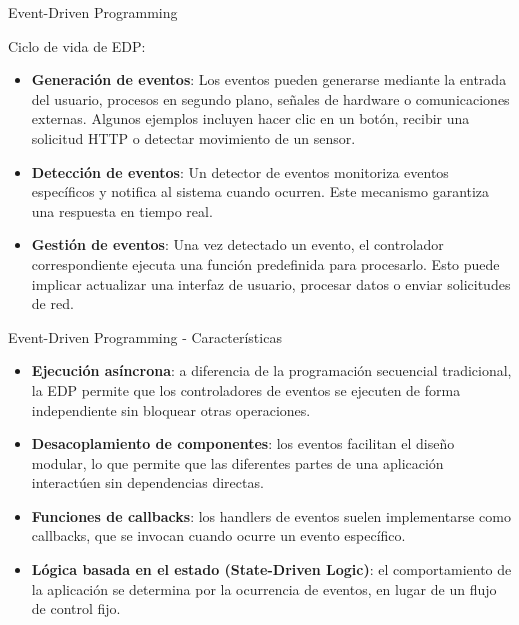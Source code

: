 \documentclass[11pt]{beamer}
\begin{document}
	\begin{frame}{Event-Driven Programming}

		Ciclo de vida de EDP:
		\begin{itemize}
			\item \textbf{Generación de eventos}: Los eventos pueden generarse mediante la entrada del usuario, procesos en segundo plano, señales de hardware o comunicaciones externas. Algunos ejemplos incluyen hacer clic en un botón, recibir una solicitud HTTP o detectar movimiento de un sensor.
			\item \textbf{Detección de eventos}: Un detector de eventos monitoriza eventos específicos y notifica al sistema cuando ocurren. Este mecanismo garantiza una respuesta en tiempo real.
			\item \textbf{Gestión de eventos}: Una vez detectado un evento, el controlador correspondiente ejecuta una función predefinida para procesarlo. Esto puede implicar actualizar una interfaz de usuario, procesar datos o enviar solicitudes de red.
			
		\end{itemize}	
			
	\end{frame}
	
	\begin{frame}{Event-Driven Programming - Características}
	\begin{itemize}
		\item \textbf{Ejecución asíncrona}: a diferencia de la programación secuencial tradicional, la EDP permite que los controladores de eventos se ejecuten de forma independiente sin bloquear otras operaciones.
		\item \textbf{Desacoplamiento de componentes}: los eventos facilitan el diseño modular, lo que permite que las diferentes partes de una aplicación interactúen sin dependencias directas.
		\item \textbf{Funciones de callbacks}: los handlers de eventos suelen implementarse como callbacks, que se invocan cuando ocurre un evento específico.
		\item \textbf{Lógica basada en el estado (State-Driven Logic)}: el comportamiento de la aplicación se determina por la ocurrencia de eventos, en lugar de un flujo de control fijo.
	\end{itemize} 
	\end{frame}
	
\end{document}

